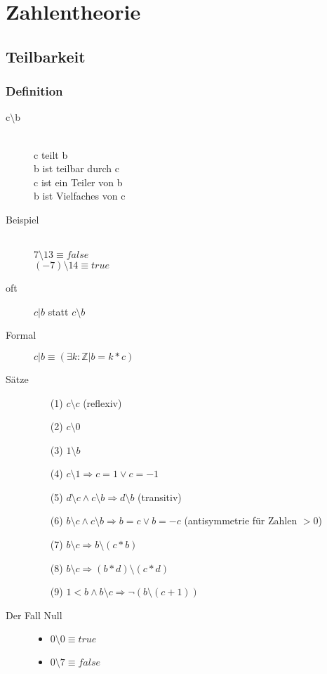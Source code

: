 \documentclass[a4paper,10pt]{article}
\newcommand{\ZN}{\mathbb{Z}} %
\newcommand{\Teilt}{\setminus} %
\newcommand{\Ra}{\Rightarrow}
\begin{document}
\newpage
\section{Zahlentheorie}

\subsection{Teilbarkeit}
\subsubsection{Definition}
\begin{description}
	\item[c$ \Teilt $b] \hfill \\
		c teilt b \\
		b ist teilbar durch c \\
		c ist ein Teiler von b \\
		b ist Vielfaches von c
	\item[Beispiel] \hfill \\
		$7  \Teilt  13 \equiv false$ \\
		$(-7)  \Teilt  14 \equiv true$
	\item[oft] $c|b$ statt $c  \Teilt  b$
	\item[Formal] $c|b \equiv (\exists k:\ZN|b=k*c)$
	\item[S\"atze] \hfill
		\begin{itemize}
			\item[(1)] $c \Teilt c$ (reflexiv)
			\item[(2)] $c \Teilt 0$
			\item[(3)] $1 \Teilt b$
			\item[(4)] $c \Teilt 1 \Ra c=1 \vee c=-1$
			\item[(5)] $d \Teilt c \wedge c \Teilt b \Ra d \Teilt b$ (transitiv)
			\item[(6)] $b \Teilt c \wedge c \Teilt b \Ra b=c \vee b=-c$ (antisymmetrie f\"ur Zahlen $>0$)
			\item[(7)] $b \Teilt c \Ra b \Teilt (c*b)$
			\item[(8)] $b \Teilt c \Ra (b*d) \Teilt (c*d)$
			\item[(9)] $1 < b \wedge b \Teilt c \Ra \neg (b \Teilt (c+1))$
		\end{itemize}
	\item[Der Fall Null] \hfill
		\begin{itemize}
			\item $0 \Teilt 0 \equiv true$
			\item $0 \Teilt 7 \equiv false$
		\end{itemize}
\end{description}
\end{document}
